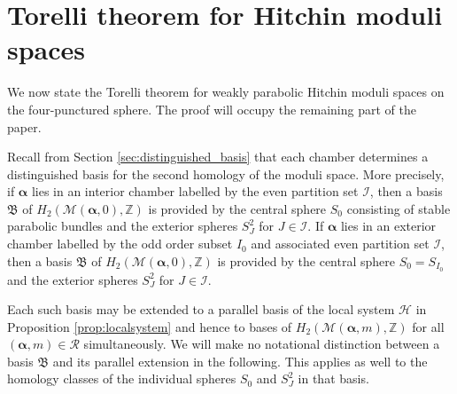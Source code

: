 \documentclass[12pt,letterpaper,reqno]{amsart}
\def\mathbf#1{#1}%
\theoremstyle{remark}
\theoremstyle{definition}
\numberwithin{thm}{section}
\numberwithin{equation}{section}
\numberwithin{figure}{section}
\newcommand{\cM}{\ensuremath{\mathcal M}}
\newcommand{\Z}{\ensuremath{\mathbb Z}}
\begin{document}
\section{Torelli theorem for Hitchin moduli spaces}\label{sec:Torelli}

We now state the Torelli theorem for weakly parabolic Hitchin moduli spaces on the four-punctured sphere. The proof will occupy the remaining part of the paper.
 

Recall from Section \ref{sec:distinguished_basis} that each chamber determines a distinguished basis for the second homology of the moduli space. More precisely, if $\boldsymbol{\alpha}$ lies in an interior chamber labelled by the even partition set $\mathcal{I}$, then a basis $\mathfrak{B}$ of $H_2(\cM(\boldsymbol{\alpha}, \mathbf{0}),\Z)$ is provided by the central sphere $S_0$ consisting of stable parabolic bundles and the exterior spheres $S^2_J$ for $J \in \mathcal{I}$. If $\boldsymbol{\alpha}$ lies in an exterior chamber labelled by the odd order subset $I_0$ and associated even partition set $\mathcal{I}$, then a basis $\mathfrak{B}$ of $H_2(\cM(\boldsymbol{\alpha}, \mathbf{0}),\Z)$ is provided by the central sphere $S_0=S_{I_0}$ and the exterior spheres $S^2_J$ for $J \in \mathcal{I}$.



Each such basis may be extended to a parallel basis of the local system $\mathcal{H}$ in Proposition \ref{prop:localsystem} and hence to bases of $H_2(\cM(\boldsymbol{\alpha}, \mathbf{m}),\Z)$ for all $(\boldsymbol{\alpha}, \mathbf{m}) \in \mathcal{R}$ simultaneously. We will make no notational distinction between a basis $\mathfrak{B}$ and its parallel extension in the following. This applies as well to the homology classes of the individual spheres $S_0$ and $S^2_J$ in that basis.
\end{document}
